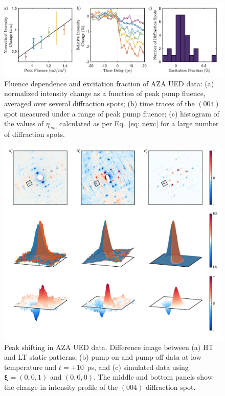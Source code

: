 \begin{figure}[b!]
  \centering
  \includegraphics[width = \textwidth]{Figures/fig_AZA_fluence.pdf}
  \caption[Fluence dependence and excitation fraction of AZA UED data.]{
  Fluence dependence and excitation fraction of AZA UED data:
  (a) normalized intensity change as a function of peak pump fluence,
  averaged over several diffraction spots;
  (b) time traces of the $(0 0 4)$ spot measured under a range of peak pump fluence;
  (c) histogram of the values of $\eta_\text{exc}$ calculated as per Eq.~\eqref{eq: nexc}
  for a large number of diffraction spots.
  }
  \label{fig: AZA-fluence}
\end{figure}

\begin{figure}[t!]
  \centering
  \includegraphics[width = \textwidth]{Figures/fig_AZA_peakshift.pdf}
  \caption[Peak shifting in AZA UED data.]{
  Peak shifting in AZA UED data.
  Difference image between (a) HT and LT static patterns,
  (b) pump-on and pump-off data at low temperature and $t = +10$~ps,
  and (c) simulated data using $\boldsymbol{\xi} = (0, 0, 1)$ and $(0, 0, 0)$.
  The middle and bottom panels show the change in intensity profile
  of the $(0 0 4)$ diffraction spot.
  }
  \label{fig: AZA-peakshift}
\end{figure}

